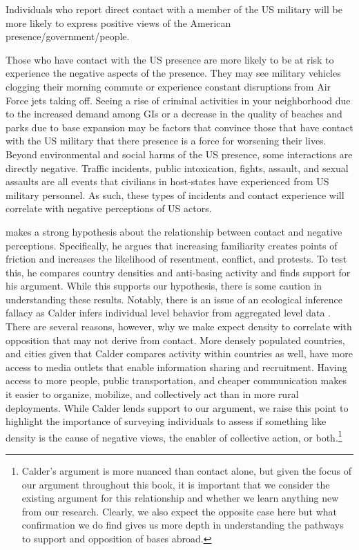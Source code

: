 \begin{subhyp}
	
	\begin{hyp}
		Individuals who report direct contact with a member of the US military will be more likely to express positive views of the American presence/government/people. 
	\end{hyp}
	
	Those who have contact with the US presence are more likely to be at risk to experience the negative aspects of the presence. They may see military vehicles clogging their morning commute or experience constant disruptions from Air Force jets taking off. Seeing a rise of criminal activities in your neighborhood due to the increased demand among GIs or a decrease in the quality of beaches and parks due to base expansion may be factors that convince those that have contact with the US military that there presence is a force for worsening their lives. Beyond environmental and social harms of the US presence, some interactions are directly negative. Traffic incidents, public intoxication, fights, assault, and sexual assaults are all events that civilians in host-states have experienced from US military personnel. As such, these types of incidents and contact experience will correlate with negative perceptions of US actors.
	
	 makes a strong hypothesis about the relationship between contact and negative perceptions. Specifically, he argues that increasing familiarity creates points of friction and increases the likelihood of resentment, conflict, and protests. To test this, he compares country densities and anti-basing activity and finds support for his argument. While this supports our hypothesis, there is some caution in understanding these results. Notably, there is an issue of an ecological inference fallacy as Calder infers individual level behavior from aggregated level data \cite{King2004}. There are several reasons, however, why we make expect density to correlate with opposition that may not derive from contact. More densely populated countries, and cities given that Calder compares activity within countries as well, have more access to media outlets that enable information sharing and recruitment. Having access to more people, public transportation, and cheaper communication makes it easier to organize, mobilize, and collectively act than in more rural deployments. While Calder lends support to our argument, we raise this point to highlight the importance of surveying individuals to assess if something like density is the cause of negative views, the enabler of collective action, or both.\footnote{Calder's argument is more nuanced than contact alone, but given the focus of our argument throughout this book, it is important that we consider the existing argument for this relationship and whether we learn anything new from our research. Clearly, we also expect the opposite case here but what confirmation we do find gives us more depth in understanding the pathways to support and opposition of bases abroad.}  %
	

\end{subhyp}
